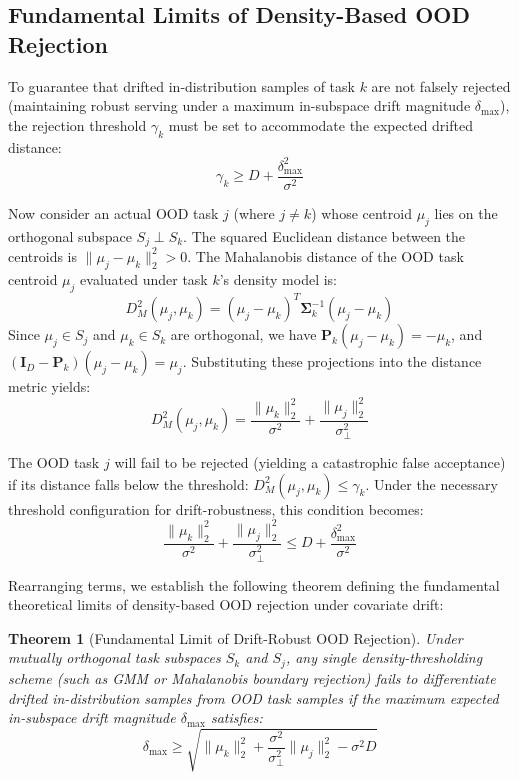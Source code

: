 \documentclass{article}
\theoremstyle{plain}
\newtheorem{theorem}{Theorem}[section]
\theoremstyle{definition}
\theoremstyle{remark}
\begin{document}
\subsection{Fundamental Limits of Density-Based OOD Rejection}
To guarantee that drifted in-distribution samples of task $k$ are not falsely rejected (maintaining robust serving under a maximum in-subspace drift magnitude $\delta_{\max}$), the rejection threshold $\gamma_k$ must be set to accommodate the expected drifted distance:
\begin{equation}
\gamma_k \ge D + \frac{\delta_{\max}^2}{\sigma^2}
\end{equation}

Now consider an actual OOD task $j$ (where $j \neq k$) whose centroid $\mu_j$ lies on the orthogonal subspace $S_j \perp S_k$. The squared Euclidean distance between the centroids is $\|\mu_j - \mu_k\|_2^2 > 0$. The Mahalanobis distance of the OOD task centroid $\mu_j$ evaluated under task $k$'s density model is:
\begin{equation}
D_M^2(\mu_j, \mu_k) = (\mu_j - \mu_k)^T \mathbf{\Sigma}_k^{-1} (\mu_j - \mu_k)
\end{equation}
Since $\mu_j \in S_j$ and $\mu_k \in S_k$ are orthogonal, we have $\mathbf{P}_k (\mu_j - \mu_k) = -\mu_k$, and $(\mathbf{I}_D - \mathbf{P}_k) (\mu_j - \mu_k) = \mu_j$. Substituting these projections into the distance metric yields:
\begin{equation}
D_M^2(\mu_j, \mu_k) = \frac{\|\mu_k\|_2^2}{\sigma^2} + \frac{\|\mu_j\|_2^2}{\sigma_\perp^2}
\end{equation}

The OOD task $j$ will fail to be rejected (yielding a catastrophic false acceptance) if its distance falls below the threshold: $D_M^2(\mu_j, \mu_k) \le \gamma_k$. Under the necessary threshold configuration for drift-robustness, this condition becomes:
\begin{equation}
\frac{\|\mu_k\|_2^2}{\sigma^2} + \frac{\|\mu_j\|_2^2}{\sigma_\perp^2} \le D + \frac{\delta_{\max}^2}{\sigma^2}
\end{equation}

Rearranging terms, we establish the following theorem defining the fundamental theoretical limits of density-based OOD rejection under covariate drift:

\begin{theorem}[Fundamental Limit of Drift-Robust OOD Rejection]
Under mutually orthogonal task subspaces $S_k$ and $S_j$, any single density-thresholding scheme (such as GMM or Mahalanobis boundary rejection) fails to differentiate drifted in-distribution samples from OOD task samples if the maximum expected in-subspace drift magnitude $\delta_{\max}$ satisfies:
\begin{equation}
\label{eq:ood_limit_bound}
\delta_{\max} \ge \sqrt{\|\mu_k\|_2^2 + \frac{\sigma^2}{\sigma_\perp^2} \|\mu_j\|_2^2 - \sigma^2 D}
\end{equation}
\end{theorem}
\end{document}
